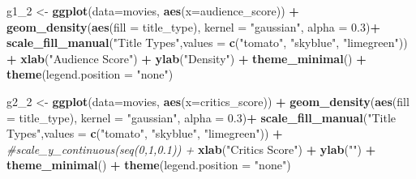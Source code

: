 \documentclass[]{article}
\newenvironment{Shaded}{\begin{snugshade}}{\end{snugshade}}
\newcommand{\KeywordTok}[1]{\textcolor[rgb]{0.13,0.29,0.53}{\textbf{#1}}}
\newcommand{\DataTypeTok}[1]{\textcolor[rgb]{0.13,0.29,0.53}{#1}}
\newcommand{\DecValTok}[1]{\textcolor[rgb]{0.00,0.00,0.81}{#1}}
\newcommand{\FloatTok}[1]{\textcolor[rgb]{0.00,0.00,0.81}{#1}}
\newcommand{\StringTok}[1]{\textcolor[rgb]{0.31,0.60,0.02}{#1}}
\newcommand{\CommentTok}[1]{\textcolor[rgb]{0.56,0.35,0.01}{\textit{#1}}}
\newcommand{\OperatorTok}[1]{\textcolor[rgb]{0.81,0.36,0.00}{\textbf{#1}}}
\newcommand{\NormalTok}[1]{#1}
\begin{document}
\begin{Shaded}
\begin{Highlighting}[]
\NormalTok{g1_}\DecValTok{2}\NormalTok{ <-}\StringTok{ }\KeywordTok{ggplot}\NormalTok{(}\DataTypeTok{data=}\NormalTok{movies, }\KeywordTok{aes}\NormalTok{(}\DataTypeTok{x=}\NormalTok{audience_score)) }\OperatorTok{+}
\StringTok{  }\KeywordTok{geom_density}\NormalTok{(}\KeywordTok{aes}\NormalTok{(}\DataTypeTok{fill =}\NormalTok{ title_type), }\DataTypeTok{kernel =} \StringTok{"gaussian"}\NormalTok{, }\DataTypeTok{alpha =} \FloatTok{0.3}\NormalTok{)}\OperatorTok{+}
\StringTok{  }\KeywordTok{scale_fill_manual}\NormalTok{(}\StringTok{"Title Types"}\NormalTok{,}\DataTypeTok{values =} \KeywordTok{c}\NormalTok{(}\StringTok{"tomato"}\NormalTok{, }\StringTok{"skyblue"}\NormalTok{, }\StringTok{"limegreen"}\NormalTok{)) }\OperatorTok{+}\StringTok{ }
\StringTok{  }\KeywordTok{xlab}\NormalTok{(}\StringTok{"Audience Score"}\NormalTok{) }\OperatorTok{+}
\StringTok{  }\KeywordTok{ylab}\NormalTok{(}\StringTok{"Density"}\NormalTok{) }\OperatorTok{+}
\StringTok{  }\KeywordTok{theme_minimal}\NormalTok{() }\OperatorTok{+}
\StringTok{  }\KeywordTok{theme}\NormalTok{(}\DataTypeTok{legend.position =} \StringTok{"none"}\NormalTok{)}

\NormalTok{g2_}\DecValTok{2}\NormalTok{ <-}\StringTok{ }\KeywordTok{ggplot}\NormalTok{(}\DataTypeTok{data=}\NormalTok{movies, }\KeywordTok{aes}\NormalTok{(}\DataTypeTok{x=}\NormalTok{critics_score)) }\OperatorTok{+}
\StringTok{  }\KeywordTok{geom_density}\NormalTok{(}\KeywordTok{aes}\NormalTok{(}\DataTypeTok{fill =}\NormalTok{ title_type), }\DataTypeTok{kernel =} \StringTok{"gaussian"}\NormalTok{, }\DataTypeTok{alpha =} \FloatTok{0.3}\NormalTok{)}\OperatorTok{+}
\StringTok{  }\KeywordTok{scale_fill_manual}\NormalTok{(}\StringTok{"Title Types"}\NormalTok{,}\DataTypeTok{values =} \KeywordTok{c}\NormalTok{(}\StringTok{"tomato"}\NormalTok{, }\StringTok{"skyblue"}\NormalTok{, }\StringTok{"limegreen"}\NormalTok{)) }\OperatorTok{+}\StringTok{ }
\StringTok{  }\CommentTok{#scale_y_continuous(seq(0,1,0.1)) +}
\StringTok{  }\KeywordTok{xlab}\NormalTok{(}\StringTok{"Critics Score"}\NormalTok{) }\OperatorTok{+}
\StringTok{  }\KeywordTok{ylab}\NormalTok{(}\StringTok{""}\NormalTok{) }\OperatorTok{+}
\StringTok{  }\KeywordTok{theme_minimal}\NormalTok{() }\OperatorTok{+}
\StringTok{  }\KeywordTok{theme}\NormalTok{(}\DataTypeTok{legend.position =} \StringTok{"none"}\NormalTok{)}


\end{Highlighting}
\end{Shaded}
\end{document}
